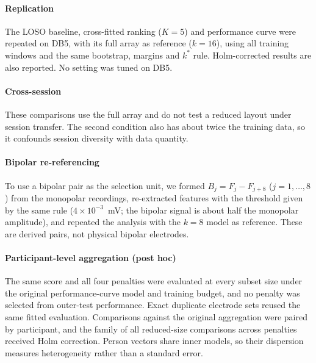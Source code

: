 \paragraph{Replication} The LOSO baseline, cross-fitted ranking ($K = 5$) and performance curve were repeated on DB5, with its full array as reference ($k = 16$), using all training windows and the same bootstrap, margins and $k^*$ rule. Holm-corrected results are also reported. No setting was tuned on DB5. 

\paragraph{Cross-session}  These comparisons use the full array and do not test a reduced layout under session transfer. The second condition also has about twice the training data, so it confounds session diversity with data quantity.

\paragraph{Bipolar re-referencing} To use a bipolar pair as the selection unit, we formed $B_j = F_j - F_{j+8}$ ($j = 1, \ldots, 8$) from the monopolar recordings, re-extracted features with the threshold given by the same rule ($4 \times 10^{-3}$~mV; the bipolar signal is about half the monopolar amplitude), and repeated the analysis with the $k = 8$ model as reference. These are derived pairs, not physical bipolar electrodes.

\paragraph{Participant-level aggregation (post hoc)}  The same score and all four penalties were evaluated at every subset size under the original performance-curve model and training budget, and no penalty was selected from outer-test performance. Exact duplicate electrode sets reused the same fitted evaluation. Comparisons against the original aggregation were paired by participant, and the family of all reduced-size comparisons across penalties received Holm correction. Person vectors share inner models, so their dispersion measures heterogeneity rather than a standard error.

